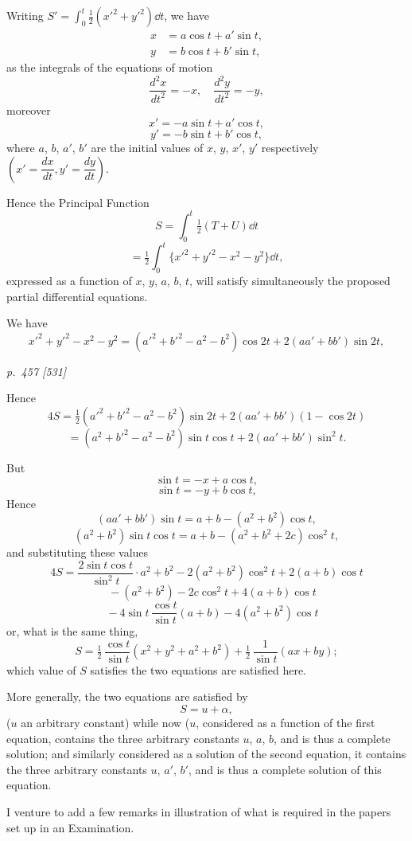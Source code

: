 \documentclass[11pt,a4paper]{book}
\begin{document}
\medskip
Writing $S' = \int_0^t \tfrac{1}{2}(x'^2 + y'^2) \dd t$, we have
\begin{align*}
x &= a\cos t + a'\sin t,\\
y &= b\cos t + b'\sin t,
\end{align*}
as the integrals of the equations of motion
\[
\frac{d^2x}{dt^2} = -x, \quad \frac{d^2y}{dt^2} = -y,
\]
moreover
\[
x' = -a\sin t + a'\cos t,
\]
\[
y' = -b\sin t + b'\cos t,
\]
where $a$, $b$, $a'$, $b'$ are the initial values of $x$, $y$, $x'$, $y'$ respectively $\left(x' = \dfrac{dx}{dt}, y' = \dfrac{dy}{dt}\right)$.

Hence the Principal Function
\[
S = \int_0^t \tfrac{1}{2}(T + U) \dd t
\]
\[
= \tfrac{1}{2}\int_0^t \{x'^2 + y'^2 - x^2 - y^2\} \dd t,
\]
expressed as a function of $x$, $y$, $a$, $b$, $t$, will satisfy simultaneously the proposed partial
differential equations.

We have
\[
x'^2 + y'^2 - x^2 - y^2 = (a'^2 + b'^2 - a^2 - b^2)\cos 2t + 2(aa' + bb')\sin 2t,
\]

\clearpage

\bigskip
\textit{p.~457 [531]}
\smallskip

Hence
\[
4S = \tfrac{1}{2}(a'^2 + b'^2 - a^2 - b^2)\sin 2t + 2(aa' + bb')(1 - \cos 2t)
\]
\[
= (a^2 + b'^2 - a^2 - b^2)\sin t\cos t + 2(aa' + bb')\sin^2 t.
\]

But
\[
\sin t = -x + a\cos t,
\]
\[
\sin t = -y + b\cos t,
\]
Hence
\[
(aa' + bb')\sin t = a + b - (a^2 + b^2)\cos t,
\]
\[
(a^2 + b^2)\sin t\cos t = a + b - (a^2 + b^2 + 2c)\cos^2 t,
\]
and substituting these values
\[
4S = \frac{2\sin t\cos t}{\sin^2 t} \cdot a^2 + b^2 - 2(a^2 + b^2)\cos^2 t + 2(a + b)\cos t
\]
\[
\quad - (a^2 + b^2) - 2c\cos^2 t + 4(a + b)\cos t
\]
\[
\quad - 4\sin t\,\frac{\cos t}{\sin t}(a + b) - 4(a^2 + b^2)\cos t
\]
or, what is the same thing,
\[
S = \tfrac{1}{2}\,\frac{\cos t}{\sin t}(x^2 + y^2 + a^2 + b^2) + \tfrac{1}{2}\,\frac{1}{\sin t}(ax + by);
\]
which value of $S$ satisfies the two equations are satisfied here.

More generally, the two equations are satisfied by
\[
S = u + \alpha,
\]
($u$ an arbitrary constant) while now (\textit{$u$}, considered as a function of the first equation, contains the three arbitrary constants $u$, $a$, $b$, and is thus a complete solution; and similarly considered as a solution of the second equation, it contains the three arbitrary constants $u$, $a'$, $b'$, and is thus a complete solution of this equation.

I venture to add a few remarks in illustration of what is required in the papers
set up in an Examination.
\end{document}
